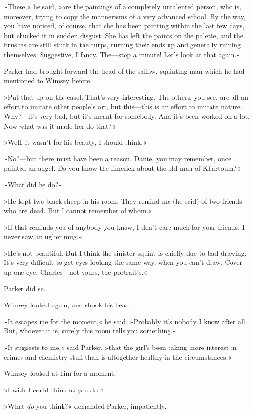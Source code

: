 »These,« he said, »are the paintings of a completely untalented person, who is, moreover, trying to copy the mannerisms of a very advanced school. By the way, you have noticed, of course, that she has been painting within the last few days, but chucked it in sudden disgust. She has left the paints on the palette, and the brushes are still stuck in the turps, turning their ends up and generally ruining themselves. Suggestive, I fancy. The—stop a minute! Let's look at that again.«

Parker had brought forward the head of the sallow, squinting man which he had mentioned to Wimsey before.

»Put that up on the easel. That's very interesting. The others, you see, are all an effort to imitate other people's art, but this—this is an effort to imitate nature. Why?—it's very bad, but it's meant for somebody. And it's been worked on a lot. Now what was it made her do that?«

»Well, it wasn't for his beauty, I should think.«

»No?—but there must have been a reason. Dante, you may remember, once painted an angel. Do you know the limerick about the old man of Khartoum?«

»What did he do?«

»He kept two black sheep in his room. They remind me (he said) of two friends who are dead. But I cannot remember of whom.«

»If that reminds you of anybody you know, I don't care much for your friends. I never saw an uglier mug.«

»He's not beautiful. But I think the sinister squint is chiefly due to bad drawing. It's very difficult to get eyes looking the same way, when you can't draw. Cover up one eye, Charles—not yours, the portrait's.«

Parker did so.

Wimsey looked again, and shook his head.

»It escapes me for the moment,« he said. »Probably it's nobody I know after all. But, whoever it is, surely this room tells you something.«

»It suggests to me,« said Parker, »that the girl's been taking more interest in crimes and chemistry stuff than is altogether healthy in the circumstances.«

Wimsey looked at him for a moment.

»I wish I could think as you do.«

»What \textit{do} you think?« demanded Parker, impatiently.

